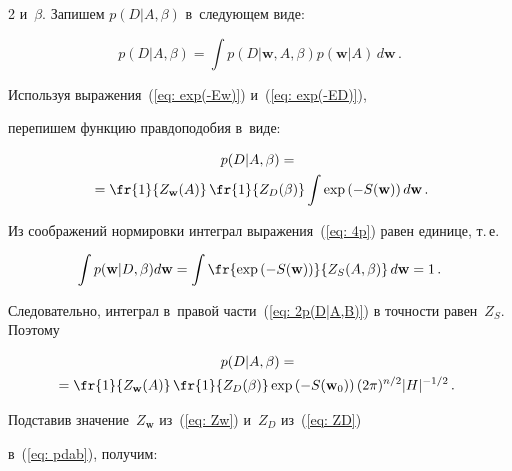 \begin{multicols}{2}
и~$\beta$. Запишем $p(D|A,\beta)$ в~следующем виде:

\begin{equation*}


p(D|A,\beta)=\int p(D|\mathbf{w},A,\beta)p(\mathbf{w}|A)\,d\mathbf{w}\,.

\end{equation*}

Используя выражения~(\ref{eq: exp(-Ew)}) и~(\ref{eq: exp(-ED)}), 

перепишем функцию правдоподобия в~виде:

\begin{multline}

\label {eq: 2p(D|A,B)}

p(D|A,\beta)={}\\

{}=\fr{1}{Z_{\mathbf{w}}(A)}\,\fr{1}{Z_{D}(\beta)}

\int \exp\left(-S(\mathbf{w})\right)d\mathbf{w}\,.

\end{multline}

Из соображений нормировки интеграл выражения~(\ref{eq: 4p}) равен единице, т.\,е.\

$$

\int p(\mathbf{w}|D,\beta)d\mathbf{w}=\int 

\fr{\exp\left(-S(\mathbf{w})\right)}{Z_{S}(A,\beta)}\,d\mathbf{w}=1\,.

$$

Следовательно, интеграл в~правой части~(\ref{eq: 2p(D|A,B)}) в точ\-ности равен~$Z_S$. Поэтому

\begin{multline}

\label {eq: pdab}

p(D|A,\beta)={}\\

\hspace*{-3mm}{}=\fr{1}{Z_{\mathbf{w}}(A)}\,\fr{1}{Z_{D}(\beta)}

\exp\left(-S(\mathbf{w}_0)\right)(2\pi)^{{n}/{2}}|H|^{-{1}/{2}}\,.\!

\end{multline}

Подставив значение~$Z_\mathbf{w}$ из~(\ref{eq: Zw}) и~$Z_D$ из~(\ref{eq: ZD}) 

в~(\ref{eq: pdab}), получим:

\begin{multline*}


\end{multline*}
\end{multicols}
